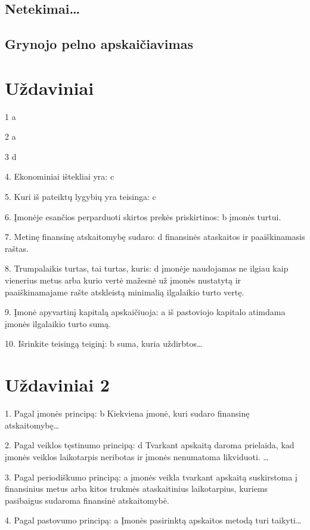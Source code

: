 \section{Netekimai…}

\section{Grynojo pelno apskaičiavimas}

\chapter{Uždaviniai}

1 a

2 a

3 d

4. Ekonominiai ištekliai yra:
c

5. Kuri iš pateiktų lygybių yra teisinga:
c

6. Įmonėje esančios perparduoti skirtos prekės priskirtinos: b
įmonės turtui.

7. Metinę finansinę atskaitomybę sudaro: d finansinės ataskaitos
ir paaiškinamasis raštas.

8. Trumpalaikis turtas, tai turtas, kuris: d įmonėje naudojamas
ne ilgiau kaip vienerius metus arba kurio vertė mažesnė už
įmonės nustatytą ir paaiškinamajame rašte atskleistą minimalią
ilgalaikio turto vertę.

9. Įmonė apyvartinį kapitalą apskaičiuoja: a iš pastoviojo kapitalo
atimdama įmonės ilgalaikio turto sumą.

10. Išrinkite teisingą teiginį: b suma, kuria uždirbtos…

\chapter{Uždaviniai 2}

1. Pagal įmonės principą:
b Kiekviena įmonė, kuri sudaro  finansinę atskaitomybę…

2. Pagal veiklos tęstinumo principą:
d Tvarkant apskaitą daroma prielaida, kad įmonės veiklos laikotarpis
neribotas ir įmonės nenumatoma likviduoti. …

3. Pagal periodiškumo principą:
a įmonės veikla tvarkant apskaitą suskirstoma į finansinius metus
arba kitos trukmės ataskaitinius laikotarpius, kuriems pasibaigus
sudaroma finansinė atskaitomybė.

4. Pagal pastovumo principą:
a Įmonės pasirinktą apskaitos metodą turi taikyti…

